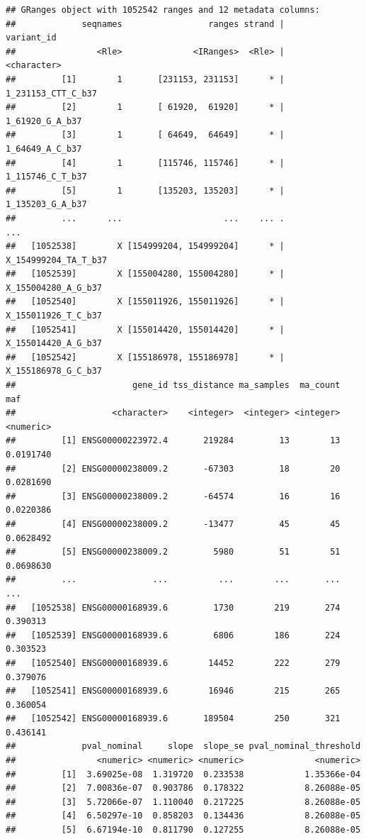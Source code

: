 \documentclass[9pt,a4paper,]{extarticle}
\begin{document}
\begin{verbatim}
## GRanges object with 1052542 ranges and 12 metadata columns:
##             seqnames                 ranges strand |           variant_id
##                <Rle>              <IRanges>  <Rle> |          <character>
##         [1]        1       [231153, 231153]      * |   1_231153_CTT_C_b37
##         [2]        1       [ 61920,  61920]      * |      1_61920_G_A_b37
##         [3]        1       [ 64649,  64649]      * |      1_64649_A_C_b37
##         [4]        1       [115746, 115746]      * |     1_115746_C_T_b37
##         [5]        1       [135203, 135203]      * |     1_135203_G_A_b37
##         ...      ...                    ...    ... .                  ...
##   [1052538]        X [154999204, 154999204]      * | X_154999204_TA_T_b37
##   [1052539]        X [155004280, 155004280]      * |  X_155004280_A_G_b37
##   [1052540]        X [155011926, 155011926]      * |  X_155011926_T_C_b37
##   [1052541]        X [155014420, 155014420]      * |  X_155014420_A_G_b37
##   [1052542]        X [155186978, 155186978]      * |  X_155186978_G_C_b37
##                       gene_id tss_distance ma_samples  ma_count       maf
##                   <character>    <integer>  <integer> <integer> <numeric>
##         [1] ENSG00000223972.4       219284         13        13 0.0191740
##         [2] ENSG00000238009.2       -67303         18        20 0.0281690
##         [3] ENSG00000238009.2       -64574         16        16 0.0220386
##         [4] ENSG00000238009.2       -13477         45        45 0.0628492
##         [5] ENSG00000238009.2         5980         51        51 0.0698630
##         ...               ...          ...        ...       ...       ...
##   [1052538] ENSG00000168939.6         1730        219       274  0.390313
##   [1052539] ENSG00000168939.6         6806        186       224  0.303523
##   [1052540] ENSG00000168939.6        14452        222       279  0.379076
##   [1052541] ENSG00000168939.6        16946        215       265  0.360054
##   [1052542] ENSG00000168939.6       189504        250       321  0.436141
##             pval_nominal     slope  slope_se pval_nominal_threshold
##                <numeric> <numeric> <numeric>              <numeric>
##         [1]  3.69025e-08  1.319720  0.233538            1.35366e-04
##         [2]  7.00836e-07  0.903786  0.178322            8.26088e-05
##         [3]  5.72066e-07  1.110040  0.217225            8.26088e-05
##         [4]  6.50297e-10  0.858203  0.134436            8.26088e-05
##         [5]  6.67194e-10  0.811790  0.127255            8.26088e-05

\end{verbatim}
\end{document}
